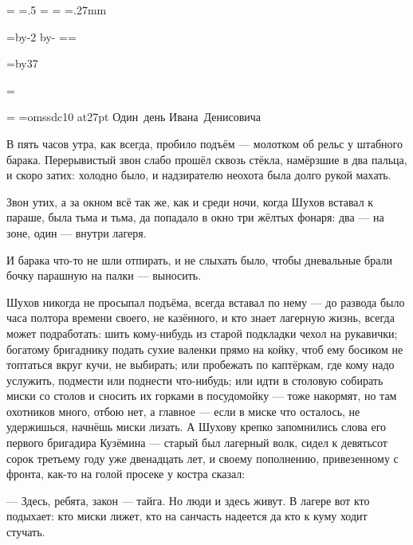 \pdfpagewidth=297mm
\pdfpageheight=210mm
\pdfhorigin=1in
\pdfvorigin=0pt

\shhtotal=\pdfpagewidth
\htotal=.5\shhtotal
\vtotal=\pdfpageheight
\shoutline=0pt
\shstaplewidth=0pt
\shcrop=0pt
\shfootline={}
\shthickness=.27mm

\horigin=9mm
\hsize=\htotal \advance\hsize by-2\horigin
\advance\hsize by-\QUIRE
\output={\ifodd\pageno\else\hoffset=\QUIRE\fi \plainoutput}

\vorigin=3.8mm
\vsize=\topskip \advance\vsize by37\baselineskip

\def\folio{{\advance\pageno by-1 \number\pageno}}
\footline={\line{\hss\tenrm\folio\hss}}

 

\bgroup
\footline={\hfil}
\font\T=omssdc10 at27pt
\topglue 5cm
\hbox{\T Один день}
\kern20pt
\hbox{\T Ивана Денисовича}
\vfil\eject
\egroup

В пять часов утра, как всегда, пробило подъём --- молотком об рельс у штабного барака.
Перерывистый звон слабо прошёл сквозь стёкла, намёрзшие в два пальца, и скоро затих: холодно
было, и надзирателю неохота была долго рукой махать.

Звон утих, а за окном всё так же, как и среди ночи, когда Шухов вставал к параше, была тьма и
тьма, да попадало в окно три жёлтых фонаря: два --- на зоне, один --- внутри лагеря.

И барака что-то не шли отпирать, и не слыхать было, чтобы дневальные брали бочку парашную на
палки --- выносить.

Шухов никогда не просыпал подъёма, всегда вставал по нему --- до развода было часа полтора
времени своего, не казённого, и кто знает лагерную жизнь, всегда может подработать: шить
кому-нибудь из старой подкладки чехол на рукавички; богатому бригаднику подать сухие
валенки прямо на койку, чтоб ему босиком не топтаться вкруг кучи, не выбирать; или пробежать
по каптёркам, где кому надо услужить, подмести или поднести что-нибудь; или идти в столовую
собирать миски со столов и сносить их горками в посудомойку --- тоже накормят, но там
охотников много, отбою нет, а главное --- если в миске что осталось, не удержишься, начнёшь
миски лизать. А Шухову крепко запомнились слова его первого бригадира Кузёмина --- старый был
лагерный волк, сидел к девятьсот сорок третьему году уже двенадцать лет, и своему
пополнению, привезенному с фронта, как-то на голой просеке у костра сказал:

--- Здесь, ребята, закон --- тайга. Но люди и здесь живут. В лагере вот кто подыхает: кто миски
лижет, кто на санчасть надеется да кто к куму ходит стучать.

